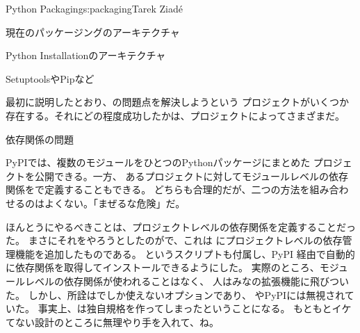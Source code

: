 \begin{aosachapter}{Python Packaging}{s:packaging}{Tarek Ziad\'{e}}
\begin{aosasect1}{現在のパッケージングのアーキテクチャ}
\begin{aosasect2}{Python Installationのアーキテクチャ}
\end{aosasect2}

\begin{aosasect2}{SetuptoolsやPipなど}

最初に説明したとおり、の問題点を解決しようという
プロジェクトがいくつか存在する。それにどの程度成功したかは、プロジェクトによってさまざまだ。

\begin{aosasect3}{依存関係の問題}

PyPIでは、複数のモジュールをひとつのPythonパッケージにまとめた
プロジェクトを公開できる。一方、
あるプロジェクトに対してモジュールレベルの依存関係をで定義することもできる。
どちらも合理的だが、二つの方法を組み合わせるのはよくない。「まぜるな危険」だ。

ほんとうにやるべきことは、プロジェクトレベルの依存関係を定義することだった。
まさにそれをやろうとしたのがで、これは
にプロジェクトレベルの依存管理機能を追加したものである。
というスクリプトも付属し、PyPI
経由で自動的に依存関係を取得してインストールできるようにした。
実際のところ、モジュールレベルの依存関係が使われることはなく、
人はみなの拡張機能に飛びついた。
しかし、所詮はでしか使えないオプションであり、
やPyPIには無視されていた。
事実上、は独自規格を作ってしまったということになる。
もともとイケてない設計のところに無理やり手を入れて、ね。


\end{aosasect3}
\end{aosasect2}
\end{aosasect1}
\end{aosachapter}
